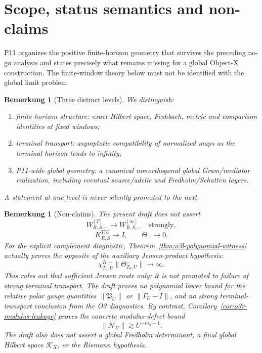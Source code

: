 \documentclass[11pt,a4paper]{amsart}
\newtheorem{remark}[theorem]{Bemerkung}
\newcommand{\KX}{\mathcal K_X}
\begin{document}
\maketitle

\section{Scope, status semantics and non-claims}\label{sec:scope}

P11 organizes the positive finite-horizon geometry that survives the preceding no-go
analysis and states precisely what remains missing for a global Object-X construction.
The finite-window theory below must not be identified with the global limit problem.

\begin{remark}[Three distinct levels]\label{rem:levels}
We distinguish:
\begin{enumerate}
  \item \emph{finite-horizon structure}: exact Hilbert-space, Feshbach, metric and
        comparison identities at fixed windows;
  \item \emph{terminal transport}: asymptotic compatibility of normalized maps as the
        terminal horizon tends to infinity;
  \item \emph{P11-wide global geometry}: a canonical nonorthogonal global
        Gram/mediator realization, including eventual source/adelic and
        Fredholm/Schatten layers.
\end{enumerate}
A statement at one level is never silently promoted to the next.
\end{remark}

\begin{remark}[Non-claims]\label{rem:nonclaims}
The present draft does not assert
\[
W_{R,S,-}^{[T]}\to W_{R,S,-}^{[\infty]}\quad\text{strongly},
\]
\[
K_{R,S}^{T,U}\to I,
\qquad
\Theta_-\to0.
\]
For the explicit complement diagnostic, Theorem~\ref{thm:o3l-polynomial-witness}
actually proves the opposite of the auxiliary Jensen-product hypothesis:
\[
 \chi_{T_0,U}^{R,-}\|\Theta_{T_0,U}^-\|\to\infty.
\]
This rules out that sufficient Jensen route only; it is not promoted to failure of
strong terminal transport.  The draft proves no polynomial lower bound for the
relative polar gauge quantities $\|\mathfrak P_U\|$ or $\|\Gamma_U-I\|$, and no strong
terminal-transport conclusion from the O3 diagnostics.  By contrast,
Corollary~\ref{cor:o3r-modulus-leakage} proves the concrete modulus-defect bound
\[
 \|\mathscr N_U\|\gtrsim U^{-m_h-1}.
\]
The draft also does not assert a global Fredholm determinant, a final global Hilbert
space $\KX$, or the Riemann hypothesis.
\end{remark}
\end{document}
